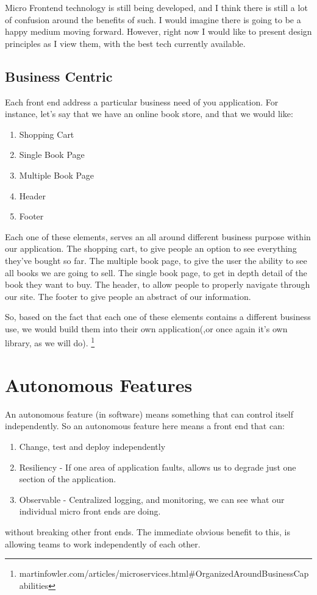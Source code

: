 Micro Frontend technology is still being developed, and I think there is still a lot of confusion around the benefits of such. I would imagine there is going to be a happy medium moving forward. However, right now I would like to present design principles as I view them, with the best tech currently available. 

\subsection{Business Centric}
Each front end address a particular business need of you application.
For instance, let's say that we have an online book store, and that we would like:
\begin{enumerate}
  \item Shopping Cart
  \item Single Book Page
  \item Multiple Book Page
  \item Header
  \item Footer 
\end{enumerate}

Each one of these elements, serves an all around different business purpose within our application. The shopping cart, to give people an option to see everything they've bought so far. The multiple book page, to give the user the ability to see all books we are going to sell. The single book page, to get in depth detail of the book they want to buy. The header, to allow people to properly navigate through our site. The footer to give people an abstract of our information.

So, based on the fact that each one of these elements contains a different business use, we would build them into their own application(,or once again it's own library, as we will do). \footnote{martinfowler.com/articles/microservices.html\#OrganizedAroundBusinessCapabilities}

\section{Autonomous Features}
An autonomous feature (in software) means something that can control itself independently. So an autonomous feature here means a front end that can:
\begin{enumerate}
  \item Change, test and deploy independently
  \item Resiliency - If one area of application faults, allows us to degrade just one section of the application. 
  \item Observable - Centralized logging, and monitoring, we can see what our individual micro front ends are doing.
\end{enumerate}
without breaking other front ends. The immediate obvious benefit to this, is allowing teams to work independently of each other.

